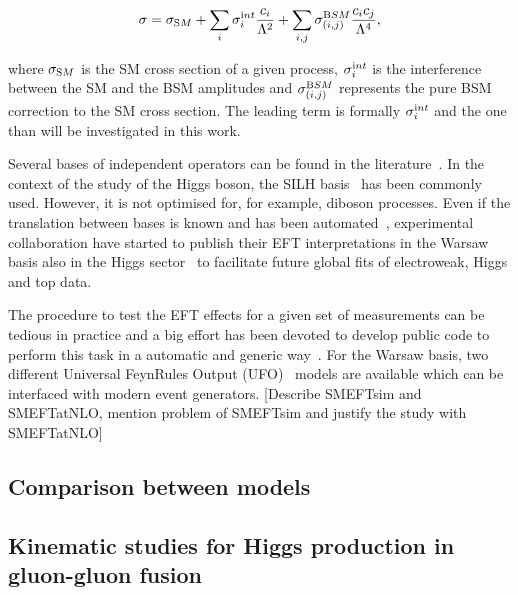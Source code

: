 \begin{equation}
\sigma = \sigma_{\textrm SM} + \sum_{i}\sigma_i^{\textrm int} \frac{c_i}{\Lambda^{2}} + \sum_{i,j}\sigma_{(i,j)}^{\textrm BSM} \frac{c_ic_j}{\Lambda^{4}} ,
\end{equation}  

where $\sigma_{\textrm SM}$ is the SM cross section of a given process, $\sigma_i^{\textrm int}$ is the interference between the SM and the BSM amplitudes and $\sigma_{(i,j)}^{\textrm BSM}$ represents the pure BSM correction to the SM cross section. The leading term is formally $\sigma_i^{\textrm int}$ and the one than will be investigated in this work. 

Several bases of independent operators can be found in the literature~\cite{Grzadkowski:2010es,Contino:2013kra,Gupta:2014rxa,Masso:2014xra}. In the context of the study of the Higgs boson, the SILH basis~\cite{Contino:2013kra} has been commonly used. However, it is not optimised for, for example, diboson processes. Even if the translation between bases is known and has been automated~\cite{Falkowski:2015wza,Aebischer:2017ugx}, experimental collaboration have started to publish their EFT interpretations in the Warsaw basis also in the Higgs sector~\cite{ATLAS:2019jst,ATL-PHYS-PUB-2019-042} to facilitate future global fits of electroweak, Higgs and top data.

The procedure to test the EFT effects for a given set of measurements can be tedious in practice and a big effort has been devoted to develop public code to perform this task in a automatic and generic way~\cite{Brivio:2019irc}. For the Warsaw basis, two different Universal FeynRules Output (UFO)~\cite{Degrande:2011ua} models are available which can be interfaced with modern event generators.
[Describe SMEFTsim and SMEFTatNLO, mention problem of SMEFTsim and justify the study with SMEFTatNLO]









\subsection{Comparison between models}
\label{sec:higgseft:section2}




\subsection{Kinematic studies for Higgs production in gluon-gluon fusion}
\label{sec:higgseft:section3}


